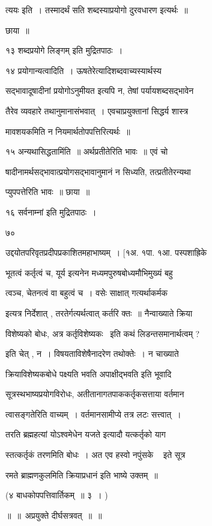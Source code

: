 \documentclass[11pt, openany]{book}
\begin{document}
त्ययः इति~। तस्मादर्थं सति शब्दस्याप्रयोगो दुरवधारण इत्यर्थः~॥ 

छाया~॥ 

१३ {\qt शब्दप्रयोगे लिङ्गम्} इति मुद्रितपाठः~। 

१४ प्रयोगान्यत्वादिति~। ऊषतेरेत्यादिशब्दवाच्यस्यार्थस्य 

सद्भावादूषादीनां प्रयोगोऽनुमीयत इत्यपि न, तेषां पर्यायशब्दसद्भावेन 

तैरेव व्यवहारे तथानुमानासंभवात्~। एवचाप्रयुक्तानां सिद्धर्य शास्त्र \textendash\ 

मावशयकमिति न नियमार्थतोपपत्तिरित्यर्थः~॥ 

१५ अन्यथासिद्धतामिंति~॥ अर्थप्रतीतेरिति भावः~॥ एवं चो \textendash\ 

षादीनामर्थसद्भावात्प्रयोगसद्भावानुमानं न सिध्यति, तत्प्रतीतेरन्यथा \textendash\ 

प्युपपत्तेरिति भावः~॥ छाया~॥ 

१६ {\qt सर्वनाम्नां इति मुद्रितपाठः~।}

७० 

उद्दयोतपरिवृतप्रदीपप्रकाशितमहाभाष्यम्~। [१अ. १पा. १आ. पस्पशाह्रिके 



भूतत्वं कर्तृत्वं च, यूर्य इत्यनेन मध्यमपुरुषबोध्यमौभिमुख्यं बहु \textendash\ 

त्वञ्च, चेतनत्वं वा बहुत्वं च~। वसेः साक्षात् {\qt गत्यर्थाकर्मक \textendash\ }

इत्यत्र निर्देशात् , तरतेर्गत्यर्थत्वात् कर्तरि क्तः~॥ नैन्वाख्याते
क्रिया \textendash\ 

विशेष्यको बोधः, अत्र कर्तृविशेष्यकः \textendash\ इति कथं लिडन्तसमानार्थत्वम् ? 

इति चेत् , न~। विषयताविशेषैनादरेण तथोक्तेः~। न चाख्याते 

क्रियाविशेष्यकबोधे पक्ष्यति भवति  {\qt अपाक्षीद्भवति} इति भूवादि \textendash\ 

सूत्रस्थभाष्यप्रयोगविरोधः, अतीतानागतपाककर्तृकसत्ताया वर्तमान \textendash\ 

त्वासङ्गतेरिति वाच्यम्~। वर्तमानसामीप्ये तत्र लटः सत्त्वात्~। 

{\qt तरति ब्रह्महत्यां योऽश्वमेधेन यजते} इत्यादौ यत्कर्तृको याग \textendash\ 

स्तत्कर्तृकं तरणमिति बोधः~। अत एव {\qt हस्वो नपुंसके \textendash\ } इते सूत्र 

{\qt रमते ब्राह्मणकुलमिति क्रियाप्रधानं} इति भाष्ये उक्तम्~॥ 

(४ बाधकोपपत्तिवार्तिकम्~॥ ३~। ) 

॥~॥~अप्रयुक्ते दीर्घसत्रवत्~॥~॥
\end{document}
